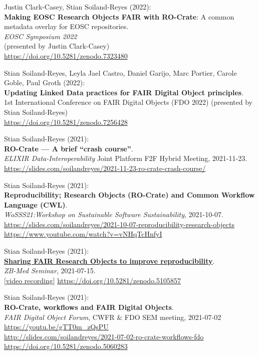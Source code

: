 Justin Clark-Casey, Stian Soiland-Reyes (2022):\\
\textbf{Making EOSC Research Objects FAIR with RO-Crate}: A common metadata overlay for EOSC repositories.\\
\emph{{EOSC Symposium 2022}}\\
(presented by Justin Clark-Casey)\\
\url{https://doi.org/10.5281/zenodo.7323480}

Stian Soiland-Reyes, Leyla Jael Castro, Daniel Garijo, Marc Portier,
Carole Goble, Paul Groth (2022):\\
\textbf{Updating Linked Data practices for FAIR Digital Object principles}.\\
1st International Conference on FAIR Digital Objects (FDO 2022)
(presented by Stian Soiland-Reyes)\\
\url{https://doi.org/10.5281/zenodo.7256428}

Stian Soiland-Reyes (2021):\\
\textbf{RO-Crate --- A brief ``crash course''}.\\
\emph{ELIXIR Data-Interoperability} Joint Platform F2F Hybrid Meeting, 2021-11-23.\\
\url{https://slides.com/soilandreyes/2021-11-23-ro-crate-crash-course/}

Stian Soiland-Reyes (2021):\\
\textbf{Reproducibility; Research Objects (RO-Crate) and Common Workflow Language (CWL)}.\\
\emph{{WoSSS21}:Workshop
on Sustainable Software Sustainability}, 2021-10-07.\\
\url{https://slides.com/soilandreyes/2021-10-07-reproducibility-research-objects}\\
\url{https://www.youtube.com/watch?v=vNHqTcHnfyI}

Stian Soiland-Reyes (2021):\\
\href{http://slides.com/soilandreyes/2021-07-15-sharing-fair-research-objects}{\textbf{Sharing
FAIR Research Objects to improve reproducibility}}.\\
\emph{ZB-Med Seminar}, 2021-07-15.\\
{[}\href{https://youtu.be/CL_fqtQRPmw}{video recording}{]}
\url{https://doi.org/10.5281/zenodo.5105857}

Stian Soiland-Reyes (2021):\\
\textbf{RO-Crate, workflows and FAIR Digital Objects}.\\
\emph{FAIR Digital Object Forum}, {CWFR \& FDO SEM meeting}, 2021-07-02\\
\url{https://youtu.be/gTT0m_zQsPU}\\
\url{http://slides.com/soilandreyes/2021-07-02-ro-crate-workflows-fdo}\\
\url{https://doi.org/10.5281/zenodo.5060283}


